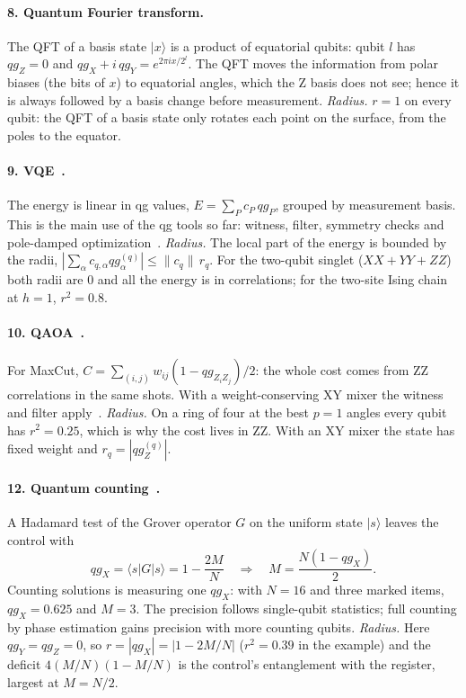 \documentclass[11pt]{article}
\newcommand{\q}[1]{qg_{#1}}
\newcommand{\qZ}{qg_Z}
\newcommand{\qX}{qg_X}
\newcommand{\qY}{qg_Y}
\begin{document}
\paragraph{8. Quantum Fourier transform.} The QFT of a basis state $|x\rangle$ is a product of equatorial
qubits: qubit $l$ has $\qZ=0$ and $\qX+i\,\qY=e^{2\pi i x/2^l}$. The QFT moves the information from polar biases
(the bits of $x$) to equatorial angles, which the Z basis does not see; hence it is always followed by a basis
change before measurement. \emph{Radius.} $r=1$ on every qubit: the QFT of a basis state only rotates each point on
the surface, from the poles to the equator.

\paragraph{9. VQE~\cite{peruzzo2014}.} The energy is linear in qg values, $E=\sum_P c_P\,\q{P}$, grouped by
measurement basis. This is the main use of the qg tools so far: witness, filter, symmetry checks and pole-damped
optimization~\cite{monteverde2026qang,monteverde2026witness}. \emph{Radius.} The local part of the energy is bounded by the radii,
$|\sum_\alpha c_{q,\alpha}\q{\alpha}^{(q)}|\le\|c_q\|\,r_q$. For the two-qubit singlet ($XX+YY+ZZ$) both radii are 0
and all the energy is in correlations; for the two-site Ising chain at $h=1$, $r^2=0.8$.

\paragraph{10. QAOA~\cite{farhi2014}.} For MaxCut, $C=\sum_{(i,j)}w_{ij}(1-\q{Z_iZ_j})/2$: the whole cost comes from
ZZ correlations in the same shots. With a weight-conserving XY mixer the witness and filter
apply~\cite{monteverde2026witness}. \emph{Radius.} On a ring of four at the best $p=1$ angles every qubit has $r^2=0.25$, which is
why the cost lives in ZZ. With an XY mixer the state has fixed weight and $r_q=|\qZ^{(q)}|$.

\paragraph{12. Quantum counting~\cite{brassard1998}.} A Hadamard test of the Grover operator $G$ on the uniform
state $|s\rangle$ leaves the control with
\begin{equation}\label{eq:count}
\qX=\langle s|G|s\rangle=1-\frac{2M}{N}\quad\Longrightarrow\quad M=\frac{N(1-\qX)}{2}.
\end{equation}
Counting solutions is measuring one $\qX$: with $N=16$ and three marked items, $\qX=0.625$ and $M=3$. The precision
follows single-qubit statistics; full counting by phase estimation gains precision with more counting qubits. \emph{Radius.} Here $\qY=\qZ=0$, so $r=|\qX|=|1-2M/N|$ ($r^2=0.39$ in the example) and the deficit
$4(M/N)(1-M/N)$ is the control's entanglement with the register, largest at $M=N/2$.
\end{document}
